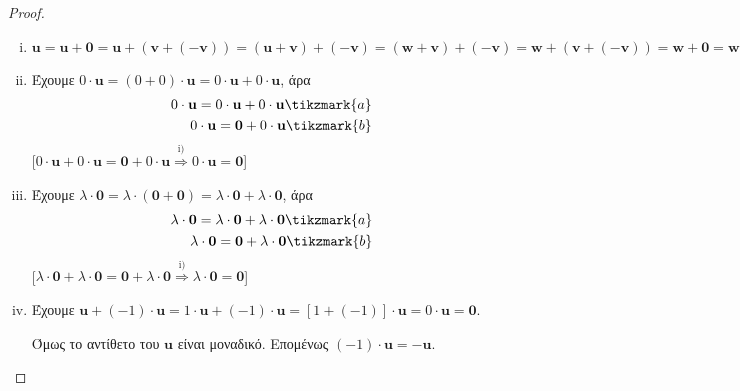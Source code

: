 \begin{proof}
\item {}
  \begin{enumerate}[i)]
    \item $ \mathbf{u} = \mathbf{u} + \mathbf{0} = \mathbf{u} + 
      (\mathbf{v} + (- \mathbf{v})) = (\mathbf{u} + \mathbf{v}) + 
      (- \mathbf{v}) = (\mathbf{w} + \mathbf{v}) + (- \mathbf{v}) = \mathbf{w} + 
      (\mathbf{v} + (- \mathbf{v})) = \mathbf{w} + \mathbf{0} = \mathbf{w}$
    \item Έχουμε $ 0\cdot \mathbf{u} = (0 + 0) 
      \cdot \mathbf{u}= 0\cdot \mathbf{u}+ 0\cdot \mathbf{u} $, άρα
      \begin{align*}
        0\cdot \mathbf{u} = 0\cdot \mathbf{u} + 0\cdot
        \mathbf{u}\tikzmark{a} \\
        0\cdot \mathbf{u} = \mathbf{0} + 0\cdot \mathbf{u} 
        \tikzmark{b}
      \end{align*} 
      [$ 0\cdot \mathbf{u} + 0\cdot \mathbf{u} = 
      \mathbf{0}+ 0\cdot \mathbf{u} \overset{\text{i)}}{\Rightarrow}  
      0\cdot \mathbf{u} = \mathbf{0}$]
    \item Έχουμε $ \lambda \cdot \mathbf{0} = \lambda \cdot 
      (\mathbf{0} + \mathbf{0}) = \lambda \cdot \mathbf{0} + \lambda 
      \cdot \mathbf{0}$, άρα 
      \begin{align*}
        \lambda \cdot \mathbf{0} = \lambda \cdot \mathbf{0} + \lambda \cdot 
        \mathbf{0} \tikzmark{a} \\
        \lambda \cdot \mathbf{0} = \mathbf{0} + \lambda \cdot \mathbf{0}
        \tikzmark{b}
      \end{align*}
      [$ \lambda \cdot \mathbf{0}+ \lambda \cdot \mathbf{0} = 
      \mathbf{0} + \lambda \cdot \mathbf{0} \overset{\text{i)}}{\Rightarrow}  
      \lambda \cdot \mathbf{0} = \mathbf{0}$]
    \item Έχουμε $ \mathbf{u} + (-1)\cdot \mathbf{u} = 1\cdot 
      \mathbf{u} + (-1)\cdot \mathbf{u} = [1+(-1)] \cdot \mathbf{u}= 0 
      \cdot \mathbf{u} = \mathbf{0} $. 

      Όμως το αντίθετο του $ \mathbf{u} $ είναι μοναδικό. Επομένως 
      $ (-1)\cdot \mathbf{u} = - \mathbf{u}$.


\end{enumerate}
\end{proof}
